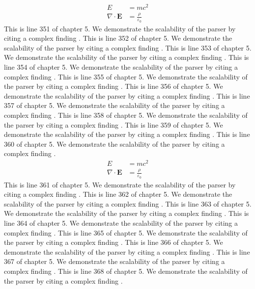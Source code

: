 \begin{align*}
  E &= mc^2 \\
  \nabla \cdot \mathbf{E} &= \frac{\rho}{\varepsilon_0}
\end{align*}
This is line 351 of chapter 5. We demonstrate the scalability of the parser by citing a complex finding \cite{ref5_351}.
This is line 352 of chapter 5. We demonstrate the scalability of the parser by citing a complex finding \cite{ref5_352}.
This is line 353 of chapter 5. We demonstrate the scalability of the parser by citing a complex finding \cite{ref5_353}.
This is line 354 of chapter 5. We demonstrate the scalability of the parser by citing a complex finding \cite{ref5_354}.
This is line 355 of chapter 5. We demonstrate the scalability of the parser by citing a complex finding \cite{ref5_355}.
This is line 356 of chapter 5. We demonstrate the scalability of the parser by citing a complex finding \cite{ref5_356}.
This is line 357 of chapter 5. We demonstrate the scalability of the parser by citing a complex finding \cite{ref5_357}.
This is line 358 of chapter 5. We demonstrate the scalability of the parser by citing a complex finding \cite{ref5_358}.
This is line 359 of chapter 5. We demonstrate the scalability of the parser by citing a complex finding \cite{ref5_359}.
This is line 360 of chapter 5. We demonstrate the scalability of the parser by citing a complex finding \cite{ref5_360}.
\begin{align*}
  E &= mc^2 \\
  \nabla \cdot \mathbf{E} &= \frac{\rho}{\varepsilon_0}
\end{align*}
This is line 361 of chapter 5. We demonstrate the scalability of the parser by citing a complex finding \cite{ref5_361}.
This is line 362 of chapter 5. We demonstrate the scalability of the parser by citing a complex finding \cite{ref5_362}.
This is line 363 of chapter 5. We demonstrate the scalability of the parser by citing a complex finding \cite{ref5_363}.
This is line 364 of chapter 5. We demonstrate the scalability of the parser by citing a complex finding \cite{ref5_364}.
This is line 365 of chapter 5. We demonstrate the scalability of the parser by citing a complex finding \cite{ref5_365}.
This is line 366 of chapter 5. We demonstrate the scalability of the parser by citing a complex finding \cite{ref5_366}.
This is line 367 of chapter 5. We demonstrate the scalability of the parser by citing a complex finding \cite{ref5_367}.
This is line 368 of chapter 5. We demonstrate the scalability of the parser by citing a complex finding \cite{ref5_368}.
